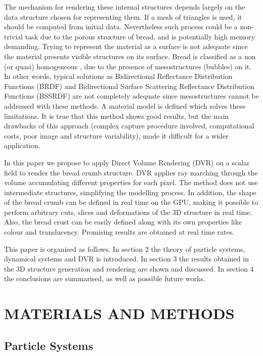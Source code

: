 \documentclass[oneside,a4paper,english,links]{amca}
\begin{document}
The mechanism for rendering these internal structures depends largely on the data structure chosen for representing them. If a mesh of triangles is used, it should be computed from initial data. Nevertheless such process could be a non-trivial task due to the porous structure of bread, and is potentially high memory demanding. Trying to represent the material as a surface is not adequate since the material presents visible structures on its surface. Bread is classified as a non (or quasi) homogeneous \citep{Tong2005}, due to the presence of mesostructures (bubbles) on it. In other words, typical solutions as Bidirectional Reflectance Distribution Functions (BRDF) \citep{Kurt2009} and Bidirectional Surface Scattering Reflectance Distribution Functions (BSSRDF) \citep{Donner2009} are not completely adequate since mesostructures cannot be addressed with these methods. A material model is defined \citep{Tong2005} which solves these limitations. It is true that this method shows good results, but the main drawbacks of this approach (complex capture procedure involved, computational costs, poor image and structure variability), made it difficult for a wider application.

In this paper we propose to apply Direct Volume Rendering (DVR) \citep{Levoy1988,Kruger2003, Kratz2006} on a scalar field to render the bread crumb structure. DVR applies ray marching through the volume accumulating different properties for each pixel. The method does not use intermediate structures, simplifying the modelling process. In addition, the shape of the bread crumb can be defined in real time on the GPU, making it possible to perform arbitrary cuts, slices and deformations of the 3D structure in real time. Also, the bread crust can be easily defined along with its own properties like colour and translucency. Promising results are obtained at real time rates. 

This paper is organised as follows. In section 2 the theory of particle systems, dynamical systems and DVR is introduced. In section 3 the results obtained in the 3D structure generation and rendering are shown and discussed. In section 4 the conclusions are summarised, as well as possible future works.

\section{MATERIALS AND METHODS}

\subsection{Particle Systems}
\end{document}
